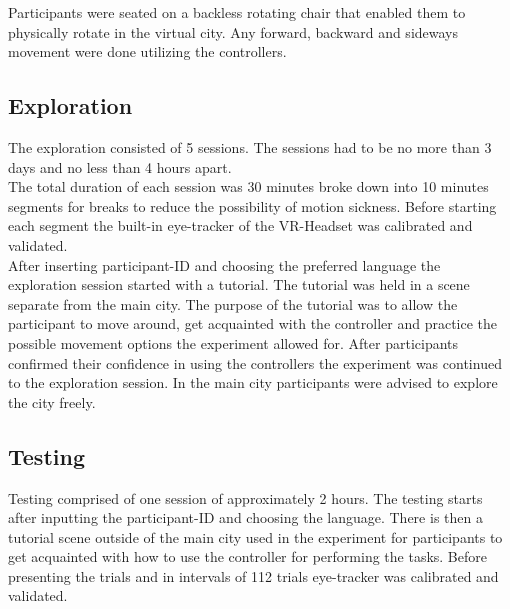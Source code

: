 Participants were seated on a backless rotating chair that enabled them to physically rotate in the virtual city. Any forward, backward and sideways movement were done utilizing the controllers.

\subsection{Exploration}

The exploration consisted of 5 sessions. The sessions had to be no more than 3 days and no less than 4 hours apart. \\
The total duration of each session was 30 minutes broke down into 10 minutes segments for breaks to reduce the possibility of motion sickness. Before starting each segment the built-in eye-tracker of the VR-Headset was calibrated and validated. \\

After inserting participant-ID and choosing the preferred language the exploration session started with a tutorial. The tutorial was held in a scene separate from the main city. The purpose of the tutorial was to allow the participant to move around, get acquainted with the controller and practice the possible movement options the experiment allowed for. After participants confirmed their confidence in using the controllers the experiment was continued to the exploration session. In the main city participants were advised to explore the city freely.

\subsection{Testing}

Testing comprised of one session of approximately 2 hours. The testing starts after inputting the participant-ID and choosing the language. There is then a tutorial scene outside of the main city used in the experiment for participants to get acquainted with how to use the controller for performing the tasks. Before presenting the trials and in intervals of 112 trials eye-tracker was calibrated and validated. \\

